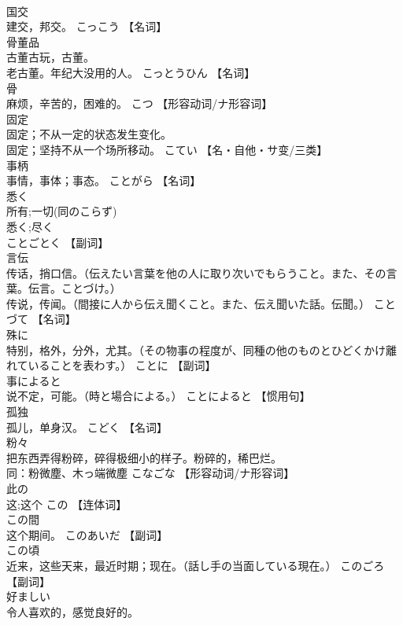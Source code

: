 \documentclass[8pt]{extreport}
\begin{document}
\begin{CJK}{UTF8}{min}
\\	国交	
\\	建交，邦交。	こっこう		【名词】
\\	骨董品	
\\	古董古玩，古董。 
\\	老古董。年纪大没用的人。	こっとうひん		【名词】
\\	骨	
\\	麻烦，辛苦的，困难的。	こつ		【形容动词/ナ形容词】
\\	固定	
\\	固定；不从一定的状态发生变化。 
\\	固定；坚持不从一个场所移动。	こてい		【名・自他・サ变/三类】
\\	事柄	
\\	事情，事体；事态。	ことがら		【名词】
\\	悉く	
\\	所有;一切(同のこらず) 
\\	悉く;尽く 
\\	ことごとく		【副词】
\\	言伝	
\\	传话，捎口信。（伝えたい言葉を他の人に取り次いでもらうこと。また、その言葉。伝言。ことづけ。） 
\\	传说，传闻。（間接に人から伝え聞くこと。また、伝え聞いた話。伝聞。）	ことづて		【名词】
\\	殊に	
\\	特别，格外，分外，尤其。（その物事の程度が、同種の他のものとひどくかけ離れていることを表わす。）	ことに		【副词】
\\	事によると	
\\	说不定，可能。（時と場合による。）	ことによると		【惯用句】
\\	孤独	
\\	孤儿，单身汉。	こどく		【名词】
\\	粉々	
\\	把东西弄得粉碎，碎得极细小的样子。粉碎的，稀巴烂。 
\\	同：粉微塵、木っ端微塵	こなごな		【形容动词/ナ形容词】
\\	此の	
\\	这;这个	この		【连体词】
\\	この間	
\\	这个期间。	このあいだ		【副词】
\\	この頃	
\\	近来，这些天来，最近时期；现在。（話し手の当面している現在。）	このごろ		【副词】
\\	好ましい	
\\	令人喜欢的，感觉良好的。 

\end{CJK}
\end{document}
